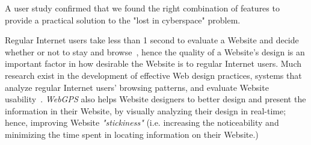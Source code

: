 \documentclass[10pt,psfig]{article}
\begin{document}
A user study confirmed that we found the right combination of features to provide a practical solution to the "lost in cyberspace" problem.

Regular Internet users take less than 1 second to evaluate a Website and decide whether or not to stay and browse~\cite{mw-04}, hence the quality of a Website's design is an important factor in how desirable the Website is to regular Internet users.
Much research exist in the development of effective Web design practices, systems that analyze regular Internet users' browsing patterns, and evaluate Website usability~\cite{w-02, ih-02}.
{\em WebGPS} also helps Website designers to better design and present the information in their Website, by visually analyzing their design in real-time; hence, improving Website {\em "stickiness"} (i.e. increasing the noticeability and minimizing the time spent in locating information on their Website.)
\end{document}
